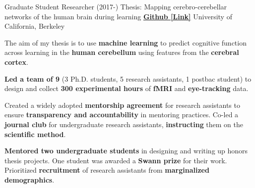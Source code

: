 

\begin{cventries}

  \cventry
    {Graduate Student Researcher (2017-)} %
    {Thesis: Mapping cerebro-cerebellar networks of the human brain during learning}
    {\href{https://github.com/maedbhk/cerebellum_learning_connect}{\textbf{Github [Link]}}}
    {University of California, Berkeley} %
    {
      \begin{cvitems} %
        \item {The aim of my thesis is to use \textbf{machine learning} to predict cognitive function across learning in the \textbf{human cerebellum} using features from the \textbf{cerebral cortex}.} 
        \item {\textbf{Led a team of 9} (3 Ph.D. students, 5 research assistants, 1 postbac student) to design and collect \textbf{300 experimental hours} of \textbf{fMRI} and \textbf{eye-tracking} data.}
        \item {Created a widely adopted \textbf{mentorship agreement} for research assistants to ensure \textbf{transparency and accountability} in mentoring practices. Co-led a \textbf{journal club} for undergraduate research assistants, \textbf{instructing} them on the \textbf{scientific method}.}
        \item {\textbf{Mentored two undergraduate students} in designing and writing up honors thesis projects. One student was awarded a \textbf{Swann prize} for their work. Prioritized \textbf{recruitment} of research assistants from \textbf{marginalized demographics}.}
      \end{cvitems}
    }
    

\end{cventries}
